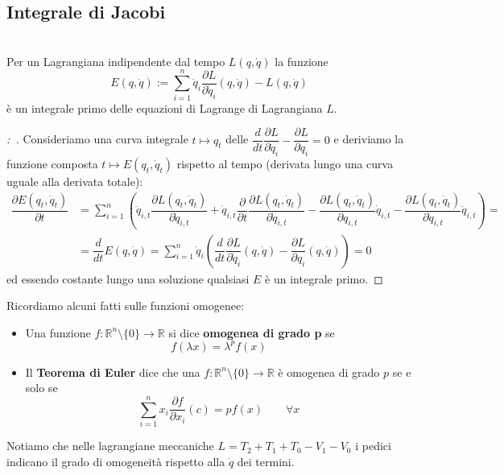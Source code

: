 \documentclass[11pt,a4paper,twoside]{book}
\newenvironment{proposizione}[1][\empty]{\begin{Proposizione}{
\ifx\empty#1\relax\else\mdseries\itshape#1\\\fi
}{}}{\end{Proposizione}}
\newenvironment{dimo}[1][\proofname]{
	\begin{tcolorbox}[
	breakable, 
	enhanced, 
	interior hidden, 
	frame hidden, 
	borderline west = {1pt}{0pt}{gray}, 
	top=0pt, bottom=0pt, left=0pt]
\begin{proof}[#1:~]
}
{
\end{proof}
\end{tcolorbox}
}
\theoremstyle{esss}
\theoremstyle{dotless}
\numberwithin{equation}{section} %
\begin{document}
\subsection{Integrale di Jacobi}
\begin{proposizione}
Per un Lagrangiana indipendente dal tempo $L(q,\dot{q})$ la funzione
\[
E(q,\dot{q}):=\sum_{i=1}^n \dot{q}_i\dfrac{\partial L}{\partial \dot{q}_i}(q,\dot{q}) -L(q,\dot{q})
\]
è un integrale primo delle equazioni di Lagrange di Lagrangiana $L$.
\end{proposizione}
\begin{dimo}
Consideriamo una curva integrale $t\mapsto q_t$ delle $\dfrac{d}{dt}\dfrac{\partial L}{\partial\dot{q}_i}-\dfrac{\partial L}{\partial q_i}=0$ e deriviamo la funzione composta $t\mapsto E(q_t,\dot{q}_t)$ rispetto al tempo (derivata lungo una curva uguale alla derivata totale):
\begin{align*}
\dfrac{\partial E(q_t,\dot{q}_t)}{\partial t}&=
\sum_{i=1}^n\left(
\ddot{q}_{i,t}\dfrac{\partial L(q_t,\dot{q}_t)}{\partial \dot{q}_{i,t}}+\dot{q}_{i,t}\dfrac{\partial}{\partial t}\dfrac{\partial L(q_t,\dot{q}_t)}{\partial\dot{q}_{i,t}}
-\dfrac{\partial L(q_t,\dot{q}_t)}{\partial q_{i,t}}\dot{q}_{i,t}-\dfrac{\partial L(q_t,\dot{q}_t)}{\partial \dot{q}_{i,t}}\ddot{q}_{i,t}
\right)=\\
&=\dfrac{d}{dt}E(q,\dot{q})=\sum_{i=1}^n \dot{q}_i\left(\dfrac{d}{dt}\dfrac{\partial L}{\partial \dot{q}_i}(q,\dot{q})-\dfrac{\partial L}{\partial q_i}(q,\dot{q})
\right)=0
\end{align*}
ed essendo costante lungo una soluzione qualsiasi $E$ è un integrale primo.\qedhere
\end{dimo}
Ricordiamo alcuni fatti sulle funzioni omogenee:\begin{itemize}
\item Una funzione $f:\mathbb{R}^n\setminus\{0\}\rightarrow\mathbb{R}$ si dice \textbf{omogenea di grado p} se
\begin{equation}
f(\lambda x)=\lambda^pf(x)
\end{equation}
\item Il \textbf{Teorema di Euler} dice che una $f:\mathbb{R}^n\setminus\{0\}\rightarrow\mathbb{R}$ è omogenea di grado $p$ se e solo se
\begin{equation}
\sum_{i=1}^n x_i\dfrac{\partial f}{\partial x_i}(c)=pf(x) \qquad \forall x
\end{equation}
\end{itemize}
Notiamo che nelle lagrangiane meccaniche $L=T_2+T_1+T_0-V_1-V_0$ i pedici indicano il grado di omogeneità rispetto alla $\dot{q}$ dei termini.\par
\end{document}
